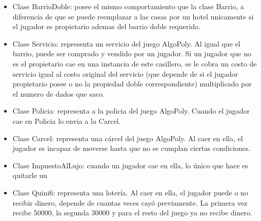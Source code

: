 \documentclass[titlepage,a4paper]{article}
\begin{document}
\begin{itemize}
\item 
Clase BarrioDoble: posee el mismo comportamiento que la clase Barrio, a diferencia de que se puede reemplazar a las casas por un hotel unicamente si el jugador es propietario ademas del barrio doble requerido.
\end{itemize}

\begin{itemize}
\item 
Clase Servicio: representa un servicio del juego AlgoPoly. Al igual que el barrio, puede ser comprado y vendido por un jugador. Si un jugador que no es el propietario cae en una instancia de este casillero, se le cobra un costo de servicio igual al costo original del servicio (que depende de si el jugador propietario posee o no la propiedad doble correspondiente) multiplicado por el numero de dados que saco.
\end{itemize}

\begin{itemize}
\item 
Clase Policia: representa a la policia del juego AlgoPoly. Cuando el jugador cae en Policia lo envia a la Carcel.
\end{itemize}

\begin{itemize}
\item 
Clase Carcel: representa una cárcel del juego AlgoPoly. Al caer en ella, el jugador es incapaz de moverse hasta que no se cumplan ciertas condiciones.
\end{itemize}

\begin{itemize}
\item 
Clase ImpuestoAlLujo: cuando un jugador cae en ella, lo único que hace es quitarle un %
\end{itemize}

\begin{itemize}
\item 
Clase Quini6: representa una lotería. Al caer en ella, el jugador puede o no recibir dinero, depende de cuantas veces cayó previamente. La primera vez recibe 50000, la segunda 30000 y para el resto del juego ya no recibe dinero.
\end{itemize}
\end{document}
